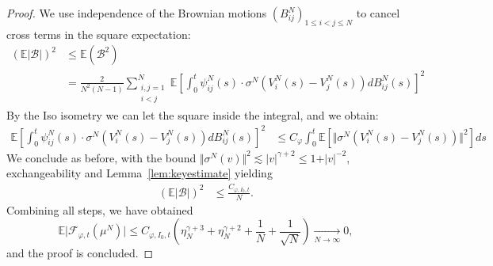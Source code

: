 \documentclass[10pt,a4paper]{amsart}
\begin{document}
\begin{proof}
    We use independence of the Brownian motions $(B^N_{ij})_{1\leq i<j \leq N}$ to cancel cross terms in the square expectation:
    \begin{align*}
        (\mathbb{E}\vert \mathcal{B}\vert)^2 &\leq\mathbb{E} (\mathcal{B}^2)\\
        &= \frac{2}{N^2(N-1)} \sum_{\substack{i,j=1\\ i< j}}^N \mathbb{E}\left[\int_0^t  \psi^N_{ij}(s)\cdot \sigma^N \left(V^N_i(s) - V^N_j(s)\right)dB^N_{ij}(s) \right]^2
    \end{align*}
    By the Iso isometry we can let the square inside the integral, and we obtain:
    \begin{align*}
        \mathbb{E}\left[\int_0^t  \psi^N_{ij}(s)\cdot \sigma^N \left(V^N_i(s) - V^N_j(s)\right)dB^N_{ij}(s) \right]^2 &\leq C_\varphi \int_0^t\mathbb{E}\left[ \Vert\sigma^N \left(V^N_i(s) - V^N_j(s)\right)\Vert^2 \right]ds
    \end{align*}
    We conclude as before, with the bound $\Vert\sigma^N \left(v\right)\Vert^2 \lesssim \vert v \vert^{\gamma+2} \leq 1 + \vert v \vert^{-2}$, exchangeability and Lemma~\ref{lem:keyestimate} yielding
    \begin{align*}
        (\mathbb{E}\vert \mathcal{B}\vert)^2 &\leq \frac{C_{\varphi,I_0,t}}{N}.
    \end{align*}
    Combining all steps, we have obtained
    $$\mathbb{E}\vert \mathcal{F}_{\varphi,t}(\mu^N)\vert \leq C_{\varphi,I_0,t}\left(\eta_N^{\gamma+3} + \eta_N^{\gamma+2} + \frac{1}{N}+\frac{1}{\sqrt{N}}\right)\xrightarrow[N\rightarrow\infty]{} 0,$$
    and the proof is concluded.
\end{proof}
\end{document}
